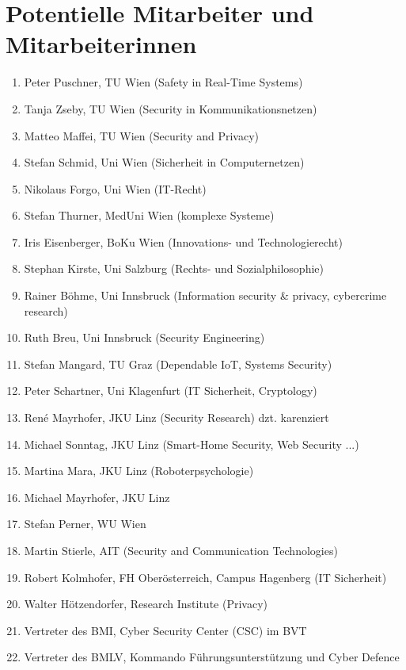 \documentclass[11pt]{scrartcl}
\begin{document}
\section{Potentielle Mitarbeiter und Mitarbeiterinnen}

\begin{enumerate}
\item Peter Puschner, TU Wien (Safety in Real-Time Systems)
\item Tanja Zseby, TU Wien (Security in Kommunikationsnetzen)
\item Matteo Maffei, TU Wien (Security and Privacy)
\item Stefan Schmid, Uni Wien (Sicherheit in Computernetzen)
\item Nikolaus Forgo, Uni Wien (IT-Recht)
\item Stefan Thurner, MedUni Wien (komplexe Systeme)
\item Iris Eisenberger, BoKu Wien (Innovations- und Technologierecht)
\item Stephan Kirste, Uni Salzburg (Rechts- und Sozialphilosophie)
\item Rainer Böhme, Uni Innsbruck (Information security \& privacy, cybercrime research)
\item Ruth Breu, Uni Innsbruck (Security Engineering)
\item Stefan Mangard, TU Graz (Dependable IoT, Systems Security)
\item Peter Schartner, Uni Klagenfurt (IT Sicherheit, Cryptology)
\item René Mayrhofer, JKU Linz (Security Research) dzt. karenziert
\item Michael Sonntag, JKU Linz (Smart-Home Security, Web Security ...)
\item Martina Mara, JKU Linz (Roboterpsychologie)
\item Michael Mayrhofer, JKU Linz
\item Stefan Perner, WU Wien
\item Martin Stierle, AIT (Security and Communication Technologies)
\item Robert Kolmhofer, FH Oberösterreich, Campus Hagenberg (IT Sicherheit)
\item Walter Hötzendorfer, Research Institute (Privacy)
\item Vertreter des BMI, Cyber Security Center (CSC) im BVT
\item Vertreter des BMLV, Kommando Führungsunterstützung und Cyber Defence

\end{enumerate}
\end{document}
